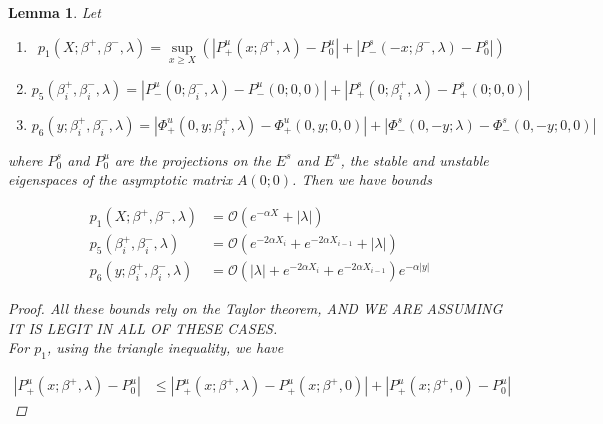 \documentclass[12pt]{article}
\newtheorem{lemma}{Lemma}
\begin{document}

\begin{lemma}\label{projbounds}
Let

\begin{enumerate}
\item
\begin{equation}\label{p1}
p_1(X; \beta^+, \beta^-, \lambda) = \sup_{x \geq X} (|P^u_+(x; \beta^+, \lambda) - P_0^u| + |P^s_-(-x; \beta^-, \lambda) - P_0^s|)
\end{equation}
\item
\begin{equation}\label{p5}
p_5(\beta_i^+, \beta_i^-, \lambda) = |P^u_-(0; \beta_i^-, \lambda) - P^u_-(0; 0, 0)| + |P^s_+(0; \beta_i^+, \lambda) - P^s_+(0; 0, 0)|
\end{equation}
\item 
\begin{equation}\label{p6}
p_6(y; \beta_i^+, \beta_i^-, \lambda) = |\Phi^u_+(0, y; \beta_i^+, \lambda) - \Phi^u_+(0, y; 0, 0)| + |\Phi^s_-(0, -y; \lambda) - \Phi^s_-(0, -y; 0, 0)| 
\end{equation}

\end{enumerate}

where $P_0^s$ and $P_0^u$ are the projections on the $E^s$ and $E^u$, the stable and unstable eigenspaces of the asymptotic matrix $A(0; 0)$. Then we have bounds

\begin{align}
p_1(X; \beta^+, \beta^-, \lambda) &= \mathcal{O}( e^{-\alpha X } + |\lambda| ) \\
p_5(\beta_i^+, \beta_i^-, \lambda) &= \mathcal{O}(e^{-2 \alpha X_i} + e^{-2 \alpha X_{i-1}} + |\lambda|) \\
p_6(y; \beta_i^+, \beta_i^-, \lambda) &= \mathcal{O}(|\lambda| + e^{-2 \alpha X_i} + e^{-2 \alpha X_{i-1}} ) e^{-\alpha |y|}
\end{align}

\begin{proof}
All these bounds rely on the Taylor theorem, AND WE ARE ASSUMING IT IS LEGIT IN ALL OF THESE CASES.\\

For $p_1$, using the triangle inequality, we have

\begin{align*}
|P^u_+(x; \beta^+, \lambda) - P_0^u| 
&\leq |P^u_+(x; \beta^+, \lambda) - P^u_+(x; \beta^+, 0)| + |P^u_+(x; \beta^+, 0) - P_0^u| 
\end{align*}


\end{proof}
\end{lemma}
\end{document}
